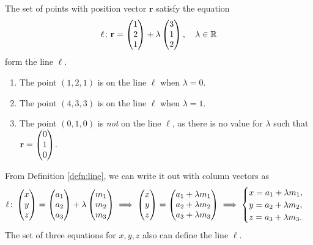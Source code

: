 \documentclass[12pt]{article}
\renewcommand{\vec}{\mathbf}
\begin{document}
\begin{eg}
	The set of points with position vector \(\vec{r}\) satisfy the equation
	\[ \ell \colon \vec{r} = \cvec{1 \\ 2 \\ 1} + \lambda \cvec{3 \\ 1 \\ 2}, \quad \lambda \in \R \] 
	form the line \(\ell\).
	\begin{enumerate}
		\item The point \((1, 2, 1)\) is on the line \(\ell\) when \(\lambda = 0\).
		\item The point \((4, 3, 3)\) is on the line \(\ell\) when \(\lambda = 1\).
		\item The point \((0, 1, 0)\) is \emph{not} on the line \(\ell\), as there is no value for \(\lambda\) such that \(\vec{r} = \cvec{0 \\ 1 \\ 0}\).
	\end{enumerate}
\end{eg}

From Definition \ref{defn:line}, we can write it out with column vectors as 
\[ \ell \colon \begin{pmatrix} x \\ y \\ z \end{pmatrix} = \begin{pmatrix} a_1 \\ a_2 \\ a_3 \end{pmatrix} + \lambda \begin{pmatrix} m_1 \\ m_2 \\ m_3 \end{pmatrix} \implies \begin{pmatrix} x \\ y \\ z \end{pmatrix} = \begin{pmatrix} a_1 + \lambda m_1 \\ a_2 + \lambda m_2 \\ a_3 + \lambda m_3 \end{pmatrix} \implies 
\begin{cases}
	x = a_1 + \lambda m_1, \\
	y = a_2 + \lambda m_2, \\
	z = a_3 + \lambda m_3.
\end{cases}\] 
The set of three equations for \(x, y, z\) also can define the line \(\ell\).
\end{document}
